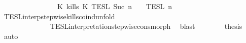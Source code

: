 \begin{isabellebody}
\ \ \ \ \ \ \ \ \ \ \ \ \ \ {\isasyminter}\ {\isasymlbrakk}\ {\isacharparenleft}K\ kills\ K\ {\isasymrbrakk}\isactrlsub T\isactrlsub E\isactrlsub S\isactrlsub L\isactrlbsup {\isasymge}\ Suc\ n\isactrlesup \ {\isasyminter}\ {\isasymlbrakk}{\isasymlbrakk}\ {\isasymPsi}\ {\isasymrbrakk}{\isasymrbrakk}\isactrlsub T\isactrlsub E\isactrlsub S\isactrlsub L\isactrlbsup {\isasymge}\ n\isactrlesup {\isacartoucheclose}\isanewline
\ \ \ \ \ \ \ \ \isamarkupfalse%
\ TESL{\isacharunderscore}interp{\isacharunderscore}stepwise{\isacharunderscore}kills{\isacharunderscore}coind{\isacharunderscore}unfold\isanewline
\ \ \ \ \ \ \ \ \ \ \ \ \ \ TESL{\isacharunderscore}interpretation{\isacharunderscore}stepwise{\isacharunderscore}cons{\isacharunderscore}morph\ \isamarkupfalse%
\ blast\isanewline
\ \ \ \ \ \ \isamarkupfalse%
\ {\isacharquery}thesis\ \isamarkupfalse%
\ auto\isanewline
\ \ \ \ \isamarkupfalse%
\isanewline
{}\isamarkupfalse%
%
\endisatagproof
{\isafoldproof}%
%
\isadelimproof
\isanewline
%
\endisadelimproof
%
\isadelimtheory
\isanewline
%
\endisadelimtheory
%
\isatagtheory
{}\isamarkupfalse%
%
\endisatagtheory
{\isafoldtheory}%
%
\isadelimtheory
%
\endisadelimtheory
%
\end{isabellebody}%
\endinput
